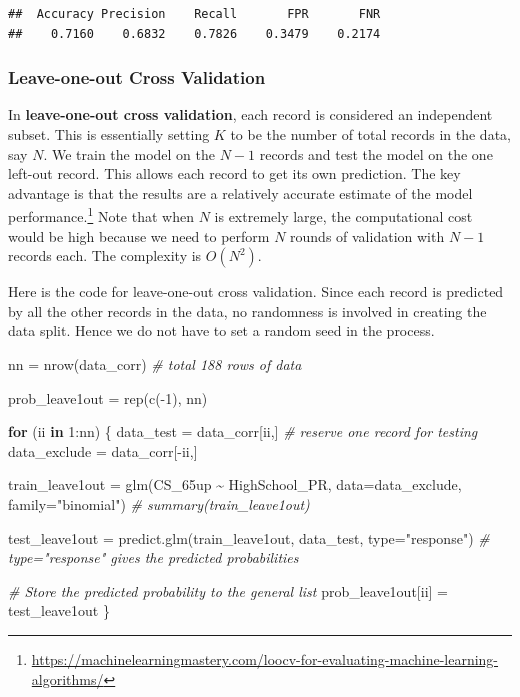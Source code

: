\documentclass[
]{article}
\newenvironment{Shaded}{\begin{snugshade}}{\end{snugshade}}
\newcommand{\AttributeTok}[1]{\textcolor[rgb]{0.77,0.63,0.00}{#1}}
\newcommand{\CommentTok}[1]{\textcolor[rgb]{0.56,0.35,0.01}{\textit{#1}}}
\newcommand{\ControlFlowTok}[1]{\textcolor[rgb]{0.13,0.29,0.53}{\textbf{#1}}}
\newcommand{\DecValTok}[1]{\textcolor[rgb]{0.00,0.00,0.81}{#1}}
\newcommand{\FunctionTok}[1]{\textcolor[rgb]{0.00,0.00,0.00}{#1}}
\newcommand{\NormalTok}[1]{#1}
\newcommand{\OtherTok}[1]{\textcolor[rgb]{0.56,0.35,0.01}{#1}}
\newcommand{\SpecialCharTok}[1]{\textcolor[rgb]{0.00,0.00,0.00}{#1}}
\newcommand{\StringTok}[1]{\textcolor[rgb]{0.31,0.60,0.02}{#1}}
\begin{document}
\begin{verbatim}
##  Accuracy Precision    Recall       FPR       FNR 
##    0.7160    0.6832    0.7826    0.3479    0.2174
\end{verbatim}

\hypertarget{leave-one-out}{%
\subsubsection{Leave-one-out Cross Validation}\label{leave-one-out}}

In \textbf{leave-one-out cross validation}, each record is considered an
independent subset. This is essentially setting \(K\) to be the number
of total records in the data, say \(N\). We train the model on the
\(N-1\) records and test the model on the one left-out record. This
allows each record to get its own prediction. The key advantage is that
the results are a relatively accurate estimate of the model
performance.\footnote{\url{https://machinelearningmastery.com/loocv-for-evaluating-machine-learning-algorithms/}}
Note that when \(N\) is extremely large, the computational cost would be
high because we need to perform \(N\) rounds of validation with \(N-1\)
records each. The complexity is \(O(N^2)\).

Here is the code for leave-one-out cross validation. Since each record
is predicted by all the other records in the data, no randomness is
involved in creating the data split. Hence we do not have to set a
random seed in the process.

\begin{Shaded}
\begin{Highlighting}[]
\NormalTok{nn }\OtherTok{=} \FunctionTok{nrow}\NormalTok{(data\_corr) }\CommentTok{\# total 188 rows of data}

\NormalTok{prob\_leave1out }\OtherTok{=} \FunctionTok{rep}\NormalTok{(}\FunctionTok{c}\NormalTok{(}\SpecialCharTok{{-}}\DecValTok{1}\NormalTok{), nn)}

\ControlFlowTok{for}\NormalTok{ (ii }\ControlFlowTok{in} \DecValTok{1}\SpecialCharTok{:}\NormalTok{nn) \{}
\NormalTok{  data\_test }\OtherTok{=}\NormalTok{ data\_corr[ii,] }\CommentTok{\# reserve one record for testing}
\NormalTok{  data\_exclude }\OtherTok{=}\NormalTok{ data\_corr[}\SpecialCharTok{{-}}\NormalTok{ii,]}

\NormalTok{  train\_leave1out }\OtherTok{=} \FunctionTok{glm}\NormalTok{(CS\_65up }\SpecialCharTok{\textasciitilde{}}\NormalTok{ HighSchool\_PR, }\AttributeTok{data=}\NormalTok{data\_exclude, }\AttributeTok{family=}\StringTok{"binomial"}\NormalTok{)}
  \CommentTok{\# summary(train\_leave1out)}
  
\NormalTok{  test\_leave1out }\OtherTok{=} \FunctionTok{predict.glm}\NormalTok{(train\_leave1out, data\_test, }\AttributeTok{type=}\StringTok{"response"}\NormalTok{)}
  \CommentTok{\# type="response" gives the predicted probabilities}

  \CommentTok{\# Store the predicted probability to the general list}
\NormalTok{  prob\_leave1out[ii] }\OtherTok{=}\NormalTok{ test\_leave1out}
\NormalTok{\}}
\end{Highlighting}
\end{Shaded}
\end{document}
